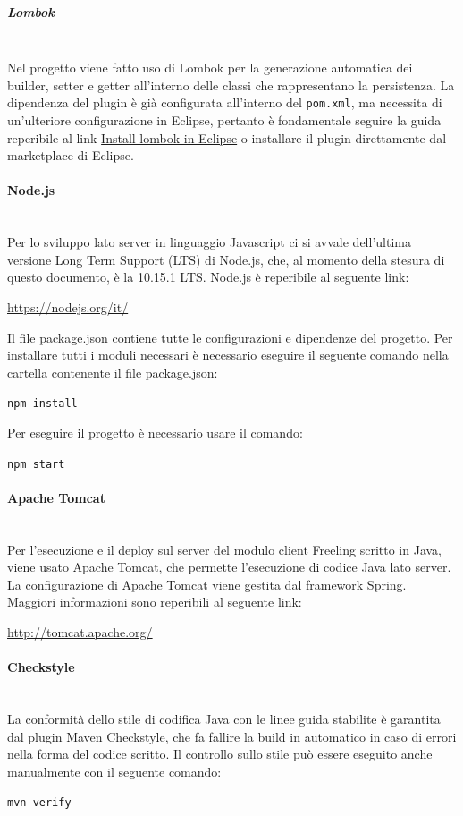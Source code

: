 \subparagraph{Lombok}\mbox{}\\
Nel progetto viene fatto uso di Lombok per la generazione automatica dei builder, setter e getter all'interno delle classi che rappresentano la persistenza. La dipendenza del plugin è già configurata all'interno del \texttt{pom.xml}, ma necessita di un'ulteriore configurazione in Eclipse, pertanto è fondamentale seguire la guida reperibile al link \href{https://howtodoinjava.com/automation/lombok-eclipse-installation-examples/}{Install lombok in Eclipse} o installare il plugin direttamente dal marketplace di Eclipse.


\paragraph{Node.js}\mbox{}\\
Per lo sviluppo lato server in linguaggio Javascript ci si avvale dell'ultima versione Long Term Support (LTS) di Node.js, che, al momento della stesura di questo documento, è la 10.15.1 LTS.
Node.js è reperibile al seguente link:
\begin{center}
	\url{https://nodejs.org/it/}
\end{center} 
Il file package.json contiene tutte le configurazioni e dipendenze del progetto. Per installare tutti i moduli necessari è necessario eseguire il seguente comando nella cartella contenente il file package.json:
\begin{center}
	\texttt{npm install}
\end{center}
Per eseguire il progetto è necessario usare il comando:
\begin{center}
	\texttt{npm start}
\end{center}

\paragraph{Apache Tomcat}\mbox{}\\
Per l'esecuzione e il deploy sul server del modulo client Freeling scritto in Java, viene usato Apache Tomcat, che permette l'esecuzione di codice Java lato server. La configurazione di Apache Tomcat viene gestita dal framework Spring.
Maggiori informazioni sono reperibili al seguente link:\newline
\begin{center}
	\url{http://tomcat.apache.org/}
\end{center}

\paragraph{Checkstyle}\mbox{}\\
La conformità dello stile di codifica Java con le linee guida stabilite è garantita dal plugin Maven Checkstyle, che fa fallire la build in automatico in caso di errori nella forma del codice scritto. Il controllo sullo stile può essere eseguito anche manualmente con il seguente comando:
\begin{center}
	\texttt{mvn verify}
\end{center}

